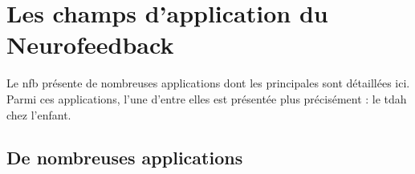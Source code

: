 


\section{Les champs d'application du Neurofeedback} \label{applications_NFB}

Le \gls{nfb} présente de nombreuses applications dont les principales sont détaillées ici. Parmi ces applications, l'une d'entre elles est présentée plus précisément :
le \gls{tdah} chez l'enfant.

\subsection{De nombreuses applications}




